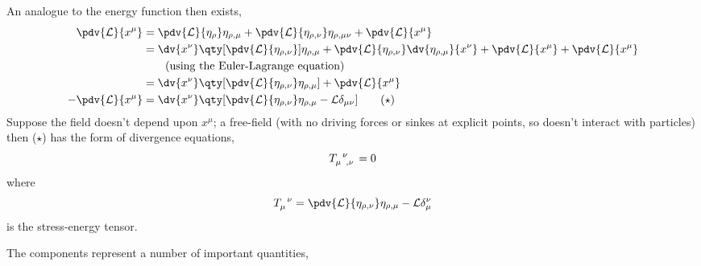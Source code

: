 An analogue to the energy function then exists,
\begin{align*}
  \pdv{\mathcal{L}}{x^{\mu}} &= \pdv{\mathcal{L}}{\eta_{\rho}} \eta_{\rho,\mu} + \pdv{\mathcal{L}}{\eta_{\rho, \nu}} \eta_{\rho, \mu\nu}+\pdv{\mathcal{L}}{x^{\mu}} \\
&= \dv{x^{\nu}} \qty[\pdv{\mathcal{L}}{\eta_{\rho,\nu}}] \eta_{\rho,\mu} + \pdv{\mathcal{L}}{\eta_{\rho,\nu}} \dv{\eta_{\rho,\mu}}{x^{\nu}} + \pdv{\mathcal{L}}{x^{\mu}} + \pdv{\mathcal{L}}{x^{\mu}} \\ &\qquad\text{(using the Euler-Lagrange equation)} \\
&= \dv{x^{\nu}} \qty[ \pdv{\mathcal{L}}{\eta_{\rho,\nu}} \eta_{\rho,\mu}] + \pdv{\mathcal{L}}{x^{\mu}} \\
- \pdv{\mathcal{L}}{x^{\mu}} &= \dv{x^{\nu}} \qty[ \pdv{\mathcal{L}}{\eta_{\rho, \nu}} \eta_{\rho,\mu} - \mathcal{L} \delta_{\mu \nu}] \tag{\(\star\)}
\end{align*}
Suppose the field doesn't depend upon $x^{\mu}$; a free-field (with no
driving forces or sinkes at explicit points, so doesn't interact with
particles) then ($\star$) has the form of divergence equations,
\[ \tensor{T}{_{\mu}^{\nu}_{,\nu}} = 0 \]
where
\begin{equation}
  \label{eq:74}
  \tensor{T}{_{\mu}^{\nu}} = \pdv{\mathcal{L}}{\eta_{\rho, \nu}} \eta_{\rho, \mu} - \mathcal{L} \delta_{\mu}^{\nu}
\end{equation}
is the stress-energy tensor.

The components represent a number of important quantities,

